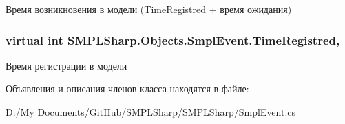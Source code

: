 Время возникновения в модели (Time\-Registred + время ожидания) 

\hypertarget{class_s_m_p_l_sharp_1_1_objects_1_1_smpl_event_a5d72178bd46b26372514d711c05a3ea2}{
\subsubsection[{Time\-Registred}]{\setlength{\rightskip}{0pt plus 5cm}virtual int S\-M\-P\-L\-Sharp.\-Objects.\-Smpl\-Event.\-Time\-Registred\hspace{0.3cm}{\ttfamily [get]}, {\ttfamily [set]}}}\label{de/d57/class_s_m_p_l_sharp_1_1_objects_1_1_smpl_event_a5d72178bd46b26372514d711c05a3ea2}


Время регистрации в модели 



Объявления и описания членов класса находятся в файле\-:\begin{DoxyCompactItemize}
\item 
D\-:/\-My Documents/\-Git\-Hub/\-S\-M\-P\-L\-Sharp/\-S\-M\-P\-L\-Sharp/Smpl\-Event.\-cs\end{DoxyCompactItemize}
